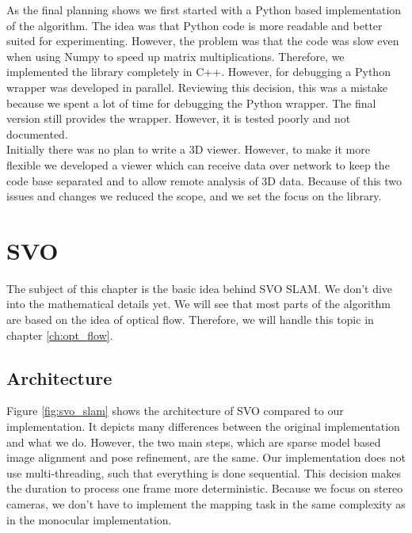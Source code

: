\documentclass[11pt,a4paper,titlepage,oneside]{report}
\begin{document}
As the final planning shows we first started with a Python based implementation of the algorithm. The idea was that Python code is more readable and better suited for experimenting. However, the problem was that the code was slow even when using Numpy to speed up matrix multiplications. Therefore, we implemented the library completely in C++. However, for debugging a Python wrapper was developed in parallel. Reviewing this decision, this was a mistake because we spent a lot of time for debugging the Python wrapper. The final version still provides the wrapper. However, it is tested poorly and not documented.\\
Initially there was no plan to write a 3D viewer. However, to make it more flexible we developed a viewer which can receive data over network to keep the code base separated and to allow remote analysis of 3D data. Because of this two issues and changes we reduced the scope, and we set the focus on the library.

\chapter{SVO}\label{ch:svo}
The subject of this chapter is the basic idea behind SVO SLAM. We don't dive into the mathematical details yet. We will see that most parts of the algorithm are based on the idea of optical flow. Therefore, we will handle this topic in chapter \ref{ch:opt_flow}.

\section{Architecture}

Figure \ref{fig:svo_slam} shows the architecture of SVO compared to our implementation. It depicts many differences between the original implementation and what we do. However, the two main steps, which are sparse model based image alignment and pose refinement, are the same. Our implementation does not use multi-threading, such that everything is done sequential. This decision makes the duration to process one frame more deterministic. Because we focus on stereo cameras, we don't have to implement the mapping task in the same complexity as in the monocular implementation.
\end{document}

